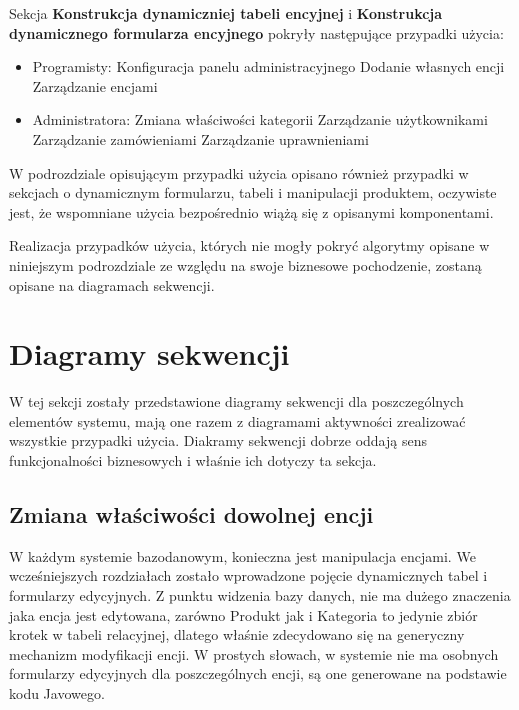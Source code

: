 Sekcja \textbf{Konstrukcja dynamiczniej tabeli encyjnej} i \textbf{Konstrukcja dynamicznego formularza encyjnego} pokryły następujące przypadki użycia:
\begin{itemize}
	\item Programisty: 
	\subitem Konfiguracja panelu administracyjnego
	\subitem Dodanie własnych encji
	\subitem Zarządzanie encjami
	\item Administratora:
	\subitem Zmiana właściwości kategorii
	\subitem Zarządzanie użytkownikami 
	\subitem Zarządzanie zamówieniami
	\subitem Zarządzanie uprawnieniami
\end{itemize}

W podrozdziale opisującym przypadki użycia opisano również przypadki w sekcjach o dynamicznym formularzu, tabeli i manipulacji produktem, oczywiste jest, że wspomniane użycia bezpośrednio wiążą się z opisanymi komponentami.

Realizacja przypadków użycia, których nie mogły pokryć algorytmy opisane w niniejszym podrozdziale ze względu na swoje biznesowe pochodzenie, zostaną opisane na diagramach sekwencji. 

\section{Diagramy sekwencji}

W tej sekcji zostały przedstawione diagramy sekwencji dla poszczególnych elementów systemu, mają one razem z diagramami aktywności zrealizować wszystkie przypadki użycia. Diakramy sekwencji dobrze oddają sens funkcjonalności biznesowych i właśnie ich dotyczy ta sekcja. 

\subsection{Zmiana właściwości dowolnej encji}
W każdym systemie bazodanowym, konieczna jest manipulacja encjami. We wcześniejszych rozdziałach zostało wprowadzone pojęcie dynamicznych tabel i formularzy edycyjnych. Z punktu widzenia bazy danych, nie ma dużego znaczenia jaka encja jest edytowana, zarówno Produkt jak i Kategoria to jedynie zbiór krotek w tabeli relacyjnej, dlatego właśnie zdecydowano się na generyczny mechanizm modyfikacji encji. W prostych słowach, w systemie nie ma osobnych formularzy edycyjnych dla poszczególnych encji, są one generowane na podstawie kodu Javowego. 

